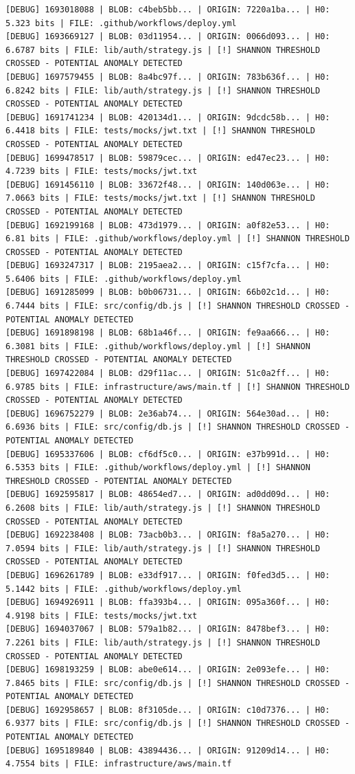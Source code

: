 \documentclass[12pt, a4paper, oneside]{report}
\begin{document}
\begin{lstlisting}[basicstyle=\tiny\ttfamily]
[DEBUG] 1693018088 | BLOB: c4beb5bb... | ORIGIN: 7220a1ba... | H0: 5.323 bits | FILE: .github/workflows/deploy.yml
[DEBUG] 1693669127 | BLOB: 03d11954... | ORIGIN: 0066d093... | H0: 6.6787 bits | FILE: lib/auth/strategy.js | [!] SHANNON THRESHOLD CROSSED - POTENTIAL ANOMALY DETECTED
[DEBUG] 1697579455 | BLOB: 8a4bc97f... | ORIGIN: 783b636f... | H0: 6.8242 bits | FILE: lib/auth/strategy.js | [!] SHANNON THRESHOLD CROSSED - POTENTIAL ANOMALY DETECTED
[DEBUG] 1691741234 | BLOB: 420134d1... | ORIGIN: 9dcdc58b... | H0: 6.4418 bits | FILE: tests/mocks/jwt.txt | [!] SHANNON THRESHOLD CROSSED - POTENTIAL ANOMALY DETECTED
[DEBUG] 1699478517 | BLOB: 59879cec... | ORIGIN: ed47ec23... | H0: 4.7239 bits | FILE: tests/mocks/jwt.txt
[DEBUG] 1691456110 | BLOB: 33672f48... | ORIGIN: 140d063e... | H0: 7.0663 bits | FILE: tests/mocks/jwt.txt | [!] SHANNON THRESHOLD CROSSED - POTENTIAL ANOMALY DETECTED
[DEBUG] 1692199168 | BLOB: 473d1979... | ORIGIN: a0f82e53... | H0: 6.81 bits | FILE: .github/workflows/deploy.yml | [!] SHANNON THRESHOLD CROSSED - POTENTIAL ANOMALY DETECTED
[DEBUG] 1693247317 | BLOB: 2195aea2... | ORIGIN: c15f7cfa... | H0: 5.6406 bits | FILE: .github/workflows/deploy.yml
[DEBUG] 1691285099 | BLOB: b0b06731... | ORIGIN: 66b02c1d... | H0: 6.7444 bits | FILE: src/config/db.js | [!] SHANNON THRESHOLD CROSSED - POTENTIAL ANOMALY DETECTED
[DEBUG] 1691898198 | BLOB: 68b1a46f... | ORIGIN: fe9aa666... | H0: 6.3081 bits | FILE: .github/workflows/deploy.yml | [!] SHANNON THRESHOLD CROSSED - POTENTIAL ANOMALY DETECTED
[DEBUG] 1697422084 | BLOB: d29f11ac... | ORIGIN: 51c0a2ff... | H0: 6.9785 bits | FILE: infrastructure/aws/main.tf | [!] SHANNON THRESHOLD CROSSED - POTENTIAL ANOMALY DETECTED
[DEBUG] 1696752279 | BLOB: 2e36ab74... | ORIGIN: 564e30ad... | H0: 6.6936 bits | FILE: src/config/db.js | [!] SHANNON THRESHOLD CROSSED - POTENTIAL ANOMALY DETECTED
[DEBUG] 1695337606 | BLOB: cf6df5c0... | ORIGIN: e37b991d... | H0: 6.5353 bits | FILE: .github/workflows/deploy.yml | [!] SHANNON THRESHOLD CROSSED - POTENTIAL ANOMALY DETECTED
[DEBUG] 1692595817 | BLOB: 48654ed7... | ORIGIN: ad0dd09d... | H0: 6.2608 bits | FILE: lib/auth/strategy.js | [!] SHANNON THRESHOLD CROSSED - POTENTIAL ANOMALY DETECTED
[DEBUG] 1692238408 | BLOB: 73acb0b3... | ORIGIN: f8a5a270... | H0: 7.0594 bits | FILE: lib/auth/strategy.js | [!] SHANNON THRESHOLD CROSSED - POTENTIAL ANOMALY DETECTED
[DEBUG] 1696261789 | BLOB: e33df917... | ORIGIN: f0fed3d5... | H0: 5.1442 bits | FILE: .github/workflows/deploy.yml
[DEBUG] 1694926911 | BLOB: ffa393b4... | ORIGIN: 095a360f... | H0: 4.9198 bits | FILE: tests/mocks/jwt.txt
[DEBUG] 1694037067 | BLOB: 579a1b82... | ORIGIN: 8478bef3... | H0: 7.2261 bits | FILE: lib/auth/strategy.js | [!] SHANNON THRESHOLD CROSSED - POTENTIAL ANOMALY DETECTED
[DEBUG] 1698193259 | BLOB: abe0e614... | ORIGIN: 2e093efe... | H0: 7.8465 bits | FILE: src/config/db.js | [!] SHANNON THRESHOLD CROSSED - POTENTIAL ANOMALY DETECTED
[DEBUG] 1692958657 | BLOB: 8f3105de... | ORIGIN: c10d7376... | H0: 6.9377 bits | FILE: src/config/db.js | [!] SHANNON THRESHOLD CROSSED - POTENTIAL ANOMALY DETECTED
[DEBUG] 1695189840 | BLOB: 43894436... | ORIGIN: 91209d14... | H0: 4.7554 bits | FILE: infrastructure/aws/main.tf
\end{lstlisting}
\end{document}
